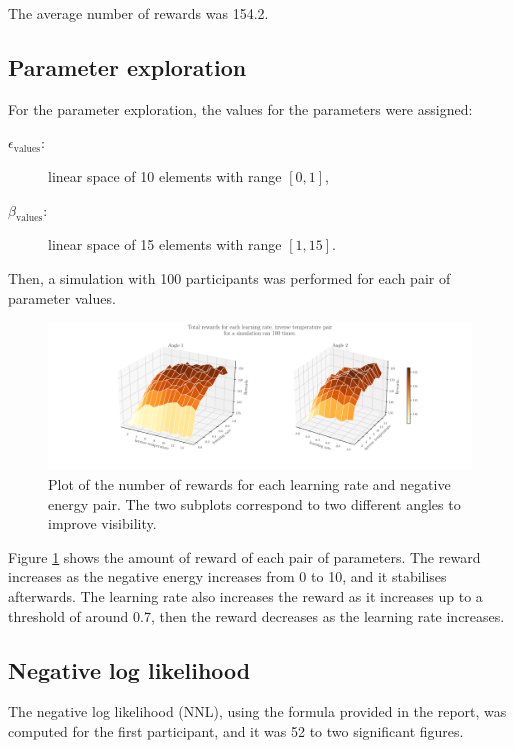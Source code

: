 \documentclass[12pt]{article}
\begin{document}
The average number of rewards was 154.2.

\subsection{Parameter exploration}

For the parameter exploration, the values for the parameters were assigned:

\begin{description}
\item[$\epsilon_{\mathrm{values}}$:] linear space of 10 elements with range $[0, 1]$, 
\item[$\beta_{\mathrm{values}}$:] linear space of 15 elements with range $[1, 15]$.
\end{description}

Then, a simulation with 100 participants was performed for each pair of parameter values. 

\begin{figure}[h!]
	\centering
	\hspace*{-2.2in}
	\includegraphics[width=1.5\linewidth]{figures/2.3.pdf}
	\caption{Plot of the number of rewards for each learning rate and negative energy pair. The two subplots correspond to two different angles to improve visibility.}
	\label{fig:2.3}
\end{figure}

Figure \ref{fig:2.3} shows the amount of reward of each pair of parameters. The reward increases as the negative energy increases from 0 to 10, and it stabilises afterwards. The learning rate also increases the reward as it increases up to a threshold of around 0.7, then the reward decreases as the learning rate increases.

\subsection{Negative log likelihood}

The negative log likelihood (NNL), using the formula provided in the report, was computed for the first participant, and it was 52 to two significant figures. 
\end{document}
